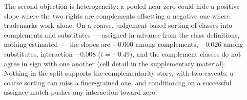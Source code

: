 The second objection is heterogeneity: a pooled near-zero could hide a
positive slope where the two rights are complements offsetting a negative
one where trademarks work alone. On a coarse, judgement-based sorting of
classes into complements and substitutes --- assigned in advance from the
class definitions, nothing estimated --- the slopes are $-0.000$ among
complements, $-0.026$ among substitutes, interaction $-0.008$
($t = -0.49$), and the complement classes do not agree in sign with one
another (cell detail in the supplementary material). Nothing in the
split supports the complementarity story, with two caveats: a coarse
sorting can miss a finer-grained one, and conditioning on a successful
assignee match pushes any interaction toward zero.

